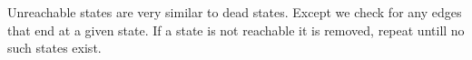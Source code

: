 Unreachable states are very similar to dead states.
Except we check for any edges that end at a given state.
If a state is not reachable it is removed,
repeat untill no such states exist.

